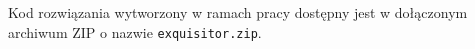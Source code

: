 \documentclass[
    bindingoffset=5mm,  %
    footnoteindent=3mm, %
    hyphenation=true    %
]{src/wut-thesis}
\begin{document}
\pagestyle{plain}
\listoffigurestoc{}
\vspace{1cm}

\listoftablestoc{}
\vspace{1cm}

\listofappendicestoc

\clearpage
{}
Kod rozwiązania wytworzony w ramach pracy dostępny jest w dołączonym archiwum ZIP o nazwie \texttt{exquisitor.zip}.
\end{document}
